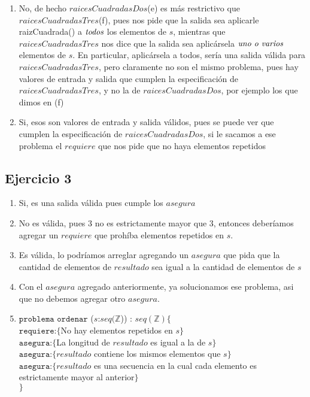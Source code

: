 \begin{enumerate}
	\item No, de hecho $raicesCuadradasDos$(e) es más restrictivo que $raicesCuadradasTres$(f), pues nos pide que la salida sea aplicarle raizCuadrada() a $\emph{todos}$ los elementos de $s$, mientras que $raicesCuadradasTres$ nos dice que la salida sea aplicársela $\emph{uno o varios}$ elementos de $s$. En particular, aplicársela a todos, sería una salida válida para $raicesCuadradasTres$, pero claramente no son el mismo problema, pues hay valores de entrada y salida que cumplen la especificación de $raicesCuadradasTres$, y no la de $raicesCuadradasDos$, por ejemplo los que dimos en (f)
	\item Si, esos son valores de entrada y salida válidos, pues se puede ver que cumplen la especificación de $raicesCuadradasDos$, si le sacamos a ese problema el $requiere$ que nos pide que no haya elementos repetidos
	\end{enumerate}
	
	\subsection{Ejercicio 3}
	\begin{enumerate}[label=(\alph*)]
	\item Si, es una salida válida pues cumple los $asegura$
	\item No es válida, pues 3 no es estrictamente mayor que 3, entonces deberíamos agregar un $requiere$ que prohíba elementos repetidos en $s$.
	\item Es válida, lo podríamos arreglar agregando un $asegura$ que pida que la cantidad de elementos de $resultado$ sea igual a la cantidad de elementos de $s$
	\item Con el $asegura$ agregado anteriormente, ya solucionamos ese problema, asi que no debemos agregar otro $asegura$.
	\item $\texttt{problema ordenar}$ ($s$:$seq(\mathbb{Z}$)) : $seq(\mathbb{Z})\lbrace$ \\
		$\texttt{requiere}$:$\lbrace$No hay elementos repetidos en $s$$\rbrace$\\
		$\texttt{asegura}$:$\lbrace$La longitud de $resultado$ es igual a la de $s$$\rbrace$\\
		$\texttt{asegura}$:$\lbrace$$resultado$ contiene los mismos elementos que $s$$\rbrace$\\
		$\texttt{asegura}$:$\lbrace$$resultado$ es una secuencia en la cual cada elemento es estrictamente mayor al anterior$\rbrace$\\
	$\rbrace$
	\end{enumerate}
	

